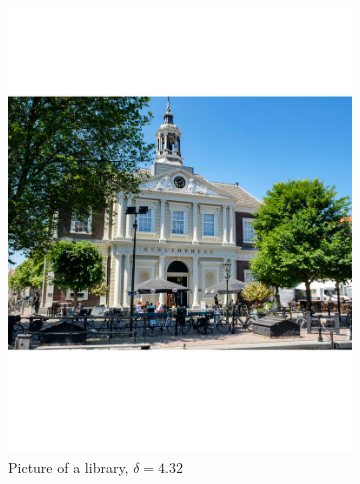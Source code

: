 \documentclass[a4paper]{article}
\begin{document}
\begin{figure}[H]
\begin{subfigure}{0.49\textwidth}
	\includegraphics[trim={4cm 8cm 4cm 8cm},clip,width=1\textwidth]{Images/BibGood.pdf}
	\caption{Picture of a library, $\delta = 4.32$}
	\label{sub:BibGood}
\end{subfigure}
	\begin{subfigure}{0.49\textwidth}
	\centering

\end{subfigure}
\end{figure}
\end{document}
